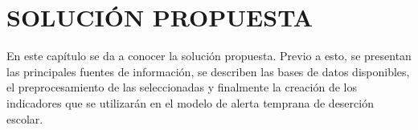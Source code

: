 \chapter{SOLUCIÓN PROPUESTA}
\label{ch:solucionpropuesta}

En este capítulo se da a conocer la solución propuesta. Previo a esto, se presentan las principales fuentes de información, se describen las bases de datos disponibles, el preprocesamiento de las seleccionadas y finalmente la creación de los indicadores que se utilizarán en el modelo de alerta temprana de deserción escolar.




